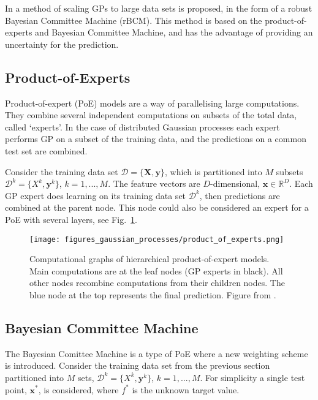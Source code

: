 \documentclass[twoside,english]{uiofysmaster}
\begin{document}
In \cite{deisenroth2015distributed} a method of scaling GPs to large data sets is proposed, in the form of a robust Bayesian Committee Machine (rBCM). This method is based on the product-of-experts and Bayesian Committee Machine, and has the advantage of providing an uncertainty for the prediction.


\subsection{Product-of-Experts}

Product-of-expert (PoE) models are a way of parallelising large computations. They combine several independent computations on subsets of the total data, called `experts'. In the case of distributed Gaussian processes each expert performs GP on a subset of the training data, and the predictions on a common test set are combined. 

Consider the training data set $\mathcal{D} = \{ \textbf{X}, \textbf{y}\}$, which is partitioned into $M$ subsets $\mathcal{D}^k = \{X^k, \textbf{y}^k \}$, $k = 1,...,M$. The feature vectors are $D$-dimensional, $\textbf{x} \in \mathbb{R}^D$. Each GP expert does learning on its training data set $\mathcal{D}^k$, then predictions are combined at the parent node. This node could also be considered an expert for a PoE with several layers, see Fig.~\ref{Fig:: gaussian process : DGP illustration of layers}. 

\begin{figure}
\texttt{[image: figures\_gaussian\_processes/product\_of\_experts.png]}
\caption{Computational graphs of hierarchical product-of-expert models. Main computations are at the leaf nodes (GP experts in black). All other nodes recombine computations from their children nodes. The blue node at the top represents the final prediction. Figure from \cite{deisenroth2015distributed}.}
\label{Fig:: gaussian process : DGP illustration of layers}
\end{figure}

\subsection{Bayesian Committee Machine}

The Bayesian Comittee Machine \cite{tresp2000bayesian} is a type of PoE where a new weighting scheme is introduced. Consider the training data set from the previous section partitioned into $M$ sets, $\mathcal{D}^k = \{X^k, \textbf{y}^k \}$, $k = 1,...,M$. For simplicity a single test point, $\textbf{x}^*$, is considered, where $f^*$ is the unknown target value.
\end{document}
